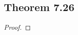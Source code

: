 \documentclass[../../main.tex]{subfiles}
\begin{document}
\subsection{Theorem 7.26}
\begin{wts}

\end{wts}
\begin{proof}

\end{proof}
\end{document}
